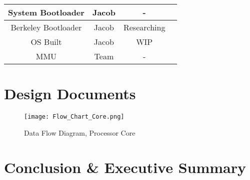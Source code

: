 \documentclass{article}
\begin{document}
\begin{table}[ht]
\begin{tabular}{|c|c|c|c|}
System Bootloader   & Jacob                 & -                  &                         \\ \hline
Berkeley Bootloader & Jacob                 & Researching        &                         \\ \hline
OS Built            & Jacob                 & WIP                &                         \\ \hline
MMU                 & Team                  & -                  &                         \\ \hline
\end{tabular}
\end{table}

\section{Design Documents}
\begin{figure}[ht]
\caption{Data Flow Diagram, Processor Core}
\label{flow}
\centering
\texttt{[image: Flow\_Chart\_Core.png]}
\end{figure}

\section{Conclusion \& Executive Summary}

\printbibliography
\end{document}
